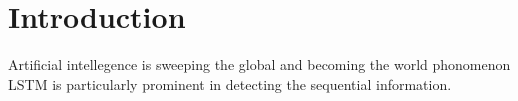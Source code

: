 \section{Introduction}
Artificial intellegence is sweeping the global and becoming the world phonomenon 
\\
LSTM is particularly prominent in detecting the sequential information. 